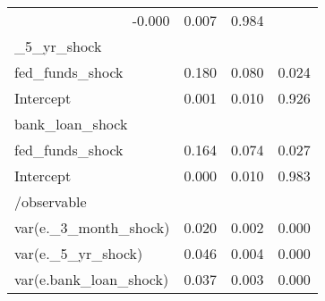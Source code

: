 \begin{table}[!h]
\begin{tabular}{llll}
  \multicolumn{1}{|r}{-0.000} &
  \multicolumn{1}{r}{0.007} &
  \multicolumn{1}{r}{0.984} \\
\multicolumn{1}{l}{\_5\_yr\_shock} &
  \multicolumn{1}{|r}{} &
  \multicolumn{1}{r}{} &
  \multicolumn{1}{r}{} \\
\multicolumn{1}{l}{\hspace{1em}fed\_funds\_shock} &
  \multicolumn{1}{|r}{0.180} &
  \multicolumn{1}{r}{0.080} &
  \multicolumn{1}{r}{0.024} \\
\multicolumn{1}{l}{\hspace{1em}Intercept} &
  \multicolumn{1}{|r}{0.001} &
  \multicolumn{1}{r}{0.010} &
  \multicolumn{1}{r}{0.926} \\
\multicolumn{1}{l}{bank\_loan\_shock} &
  \multicolumn{1}{|r}{} &
  \multicolumn{1}{r}{} &
  \multicolumn{1}{r}{} \\
\multicolumn{1}{l}{\hspace{1em}fed\_funds\_shock} &
  \multicolumn{1}{|r}{0.164} &
  \multicolumn{1}{r}{0.074} &
  \multicolumn{1}{r}{0.027} \\
\multicolumn{1}{l}{\hspace{1em}Intercept} &
  \multicolumn{1}{|r}{0.000} &
  \multicolumn{1}{r}{0.010} &
  \multicolumn{1}{r}{0.983} \\
\multicolumn{1}{l}{/observable} &
  \multicolumn{1}{|r}{} &
  \multicolumn{1}{r}{} &
  \multicolumn{1}{r}{} \\
\multicolumn{1}{l}{\hspace{1em}var(e.\_3\_month\_shock)} &
  \multicolumn{1}{|r}{0.020} &
  \multicolumn{1}{r}{0.002} &
  \multicolumn{1}{r}{0.000} \\
\multicolumn{1}{l}{\hspace{1em}var(e.\_5\_yr\_shock)} &
  \multicolumn{1}{|r}{0.046} &
  \multicolumn{1}{r}{0.004} &
  \multicolumn{1}{r}{0.000} \\
\multicolumn{1}{l}{\hspace{1em}var(e.bank\_loan\_shock)} &
  \multicolumn{1}{|r}{0.037} &
  \multicolumn{1}{r}{0.003} &
  \multicolumn{1}{r}{0.000} \\
\cline{1-4}
\end{tabular}
\end{table}
